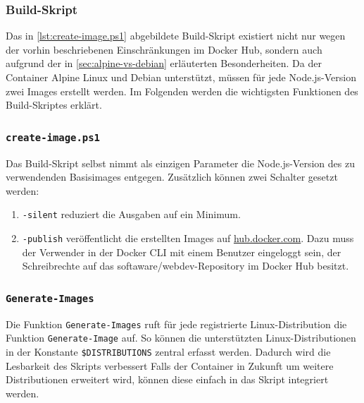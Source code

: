 \subsubsection{Build-Skript}

Das in \cref{lst:create-image.ps1} abgebildete Build-Skript existiert nicht nur wegen der vorhin beschriebenen Einschränkungen im Docker Hub, sondern auch aufgrund der in \cref{sec:alpine-vs-debian} erläuterten Besonderheiten.
Da der Container Alpine Linux und Debian unterstützt, müssen für jede Node.js-Version zwei Images erstellt werden.
Im Folgenden werden die wichtigsten Funktionen des Build-Skriptes erklärt.


\subsubsection{\texttt{create-image.ps1}}
Das Build-Skript selbst nimmt als einzigen Parameter die Node.js-Version des zu verwendenden Basisimages entgegen.
Zusätzlich können zwei Schalter gesetzt werden:
\begin{enumerate}
    \item \verb|-silent| reduziert die Ausgaben auf ein Minimum.
    \item \verb|-publish| veröffentlicht die erstellten Images auf \url{hub.docker.com}.
        Dazu muss der Verwender in der Docker CLI mit einem Benutzer eingeloggt sein, der Schreibrechte auf das softaware/webdev-Repository im Docker Hub besitzt.
\end{enumerate}

\subsubsection{\texttt{Generate-Images}}
Die Funktion \verb|Generate-Images| ruft für jede registrierte Linux-Distribution die Funktion \verb|Generate-Image| auf.
So können die unterstützten Linux-Distributionen in der Konstante \verb|$DISTRIBUTIONS| zentral erfasst werden.
Dadurch wird die Lesbarkeit des Skripts verbessert
Falls der Container in Zukunft um weitere Distributionen erweitert wird, können diese einfach in das Skript integriert werden.

